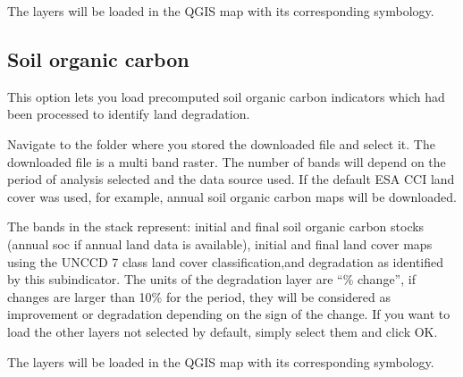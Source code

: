 \documentclass[letterpaper,10pt,english]{sphinxmanual}
\begin{document}

\sphinxAtStartPar
The layers will be loaded in the QGIS map with its corresponding symbology.



\subsection{Soil organic carbon}
\label{\detokenize{Qgis_Plugin/load_data:soil-organic-carbon}}
\sphinxAtStartPar
This option lets you load pre\sphinxhyphen{}computed soil organic carbon indicators which had been
processed to identify land degradation.

\sphinxAtStartPar
Navigate to the folder where you stored the downloaded file and select it. The downloaded file is a multi band raster. The number
of bands will depend on the period of analysis selected and the data source used. If the default ESA CCI land cover was used, for example,
annual soil organic carbon maps will be downloaded.

\sphinxAtStartPar
The bands in the stack represent: initial and final soil organic carbon stocks (annual soc if annual land data is available),
initial and final land cover maps using the UNCCD 7 class land cover classification,and degradation as identified by this
subindicator. The units of the degradation layer are “\% change”, if changes are larger than 10\% for the period, they will be
considered as improvement or degradation depending on the sign of the change. If you want to load the other layers not
selected by default, simply select them and click OK.


\sphinxAtStartPar
The layers will be loaded in the QGIS map with its corresponding symbology.

\end{document}
